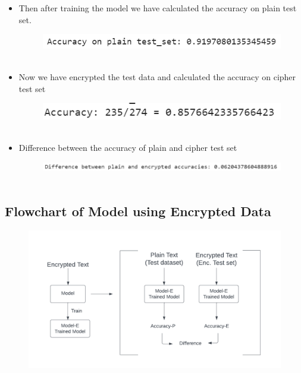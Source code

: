 \documentclass{article}
\begin{document}
\begin{itemize}
\item Then after training the model we have calculated the accuracy on plain test set.

\begin{figure}[!h]
\centering
\includegraphics[width = 3 in]{img17.png}~
\end{figure}

\item Now we have encrypted the test data and calculated the accuracy on cipher test set

\begin{figure}[!h]
\centering
\includegraphics[width = 3 in]{img17a.png}~
\end{figure}

\item Difference between the accuracy of plain and cipher test set

\begin{figure}[!h]
\centering
\includegraphics[width = 4 in]{img17b.png}~
\end{figure}
 
\end{itemize}


\subsection{Flowchart of Model using Encrypted Data}
\begin{figure}
\centering
\includegraphics[width = 4 in]{img11.png}~
\end{figure}
\end{document}
